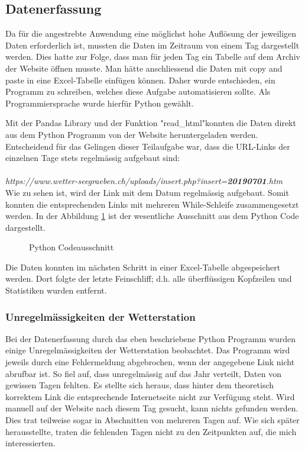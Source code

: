 \begin{refsection}
\subsection{Datenerfassung}
Da f\"ur die angestrebte Anwendung eine m\"oglichst hohe Aufl\"osung der jeweiligen Daten erforderlich ist, mussten die Daten im Zeitraum von einem Tag dargestellt werden.
Dies hatte zur Folge, dass man f\"ur jeden Tag ein Tabelle auf dem Archiv der Website \"offnen musste. Man hätte anschliessend die Daten mit copy and paste in eine Excel-Tabelle einf\"ugen können. Daher wurde  entschieden, ein Programm zu schreiben, welches diese Aufgabe automatisieren sollte.
Als Programmiersprache wurde hierf\"ur Python gewählt.


Mit der Pandas Library und der Funktion "read\_html"\space konnten die Daten direkt aus dem Python Programm von der Website heruntergeladen werden.
Entscheidend für das Gelingen dieser Teilaufgabe war, dass die URL-Links der einzelnen Tage stets regelmässig aufgebaut sind:\\
\\
\textit{https://www.wetter-seegraeben.ch/uploads/insert.php?insert=\textbf{20190701}.htm}
\\

Wie zu sehen ist, wird der Link mit dem Datum regelmässig aufgebaut. Somit konnten die entsprechenden Links mit mehreren While-Schleife zusammengesetzt werden.
In der Abbildung \ref{fig:python-code} ist der wesentliche Ausschnitt aus dem Python Code dargestellt.
\begin{figure}
	\centering
	
	\caption{Python Codeausschnitt}
	\label{fig:python-code}
\end{figure}
Die Daten konnten im nächsten Schritt in einer Excel-Tabelle abgespeichert werden.
Dort folgte der letzte Feinschliff; d.h. alle überflüssigen Kopfzeilen und Statistiken wurden entfernt.

\subsubsection{Unregelmässigkeiten der Wetterstation}
Bei der Datenerfassung durch das eben beschriebene Python Programm wurden einige Unregelmässigkeiten der Wetterstation beobachtet.
Das Programm wird jeweils durch eine Fehlermeldung abgebrochen, wenn der angegebene Link nicht abrufbar ist. 
So fiel auf, dass unregelmässig auf das Jahr verteilt, Daten von gewissen Tagen fehlten. Es stellte sich heraus, dass hinter dem theoretisch korrektem Link die entsprechende Internetseite nicht zur Verfügung steht.
Wird manuell auf der Website nach diesem Tag gesucht, kann nichts gefunden werden.
Dies trat teilweise sogar in Abschnitten von mehreren Tagen auf.
Wie sich später herausstellte, traten die fehlenden Tagen nicht zu den Zeitpunkten auf, die mich interessierten.



\end{refsection}
